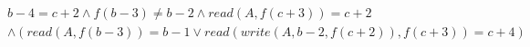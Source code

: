 \begin{align*}
%
& %
b - 4 = c + 2
%
\land
%
f(b - 3)  \neq  b - 2
%
\land
%
\mathit{read}(A,f(c + 3)) = c + 2
~\\~
& %
%
\land
%
(\mathit{read}(A,f(b - 3)) = b - 1 \lor \mathit{read}(\mathit{write}(A,b - 2,f(c + 2)),f(c + 3)) = c + 4)
%
\end{align*}
